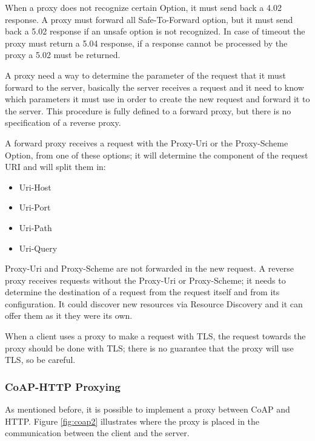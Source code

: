 	When a proxy does not recognize certain Option, it must send back a 4.02 response.\newline
	A proxy must forward all Safe-To-Forward option, but it must send back a 5.02 response if an unsafe option is not recognized.\newline
	In case of timeout the proxy must return a 5.04 response, if a response cannot be processed by the proxy a 5.02 must be returned.\newline
	
	A proxy need a way to determine the parameter of the request that it must forward to the server, basically the server receives a request and it need to know which parameters it must use in order to create the new request and forward it to the server.\newline
	This procedure is fully defined to a forward proxy, but there is no specification of a reverse proxy.\newline
	
	A forward proxy receives a request with the Proxy-Uri or the Proxy-Scheme Option, from one of these options; it will determine the component of the request URI and will split them in:
	\begin{itemize}
		\item Uri-Host
		\item Uri-Port
		\item Uri-Path
		\item Uri-Query
	\end{itemize}

	Proxy-Uri and Proxy-Scheme are not forwarded in the new request.\newline
	A reverse proxy receives requests without the Proxy-Uri or Proxy-Scheme; it needs to determine the destination of a request from the request itself and from its configuration.\newline
	It could discover new resources via Resource Discovery and it can offer them as it they were its own.\newline
	
	When a client uses a proxy to make a request with TLS, the request towards the proxy should be done with TLS; there is no guarantee that the proxy will use TLS, so be careful.\newline
	
	\subsubsection{CoAP-HTTP Proxying}
	As mentioned before, it is possible to implement a proxy between CoAP and HTTP.\newline
	Figure \ref{fig:coap2} illustrates where the proxy is placed in the communication between the client and the server.
	
